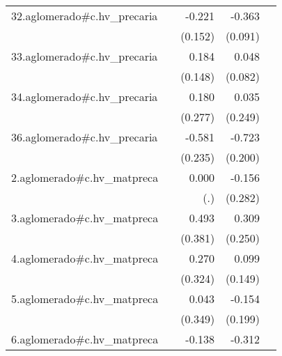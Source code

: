 {\begin{longtable}{l*{4}{D{.}{.}{-1}}}
\addlinespace
32.aglomerado#c.hv\_precaria&                     &      -0.221         &      -0.363\sym{***}&                     \\
            &                     &     (0.152)         &     (0.091)         &                     \\
\addlinespace
33.aglomerado#c.hv\_precaria&                     &       0.184         &       0.048         &                     \\
            &                     &     (0.148)         &     (0.082)         &                     \\
\addlinespace
34.aglomerado#c.hv\_precaria&                     &       0.180         &       0.035         &                     \\
            &                     &     (0.277)         &     (0.249)         &                     \\
\addlinespace
36.aglomerado#c.hv\_precaria&                     &      -0.581\sym{*}  &      -0.723\sym{***}&                     \\
            &                     &     (0.235)         &     (0.200)         &                     \\
\addlinespace
2.aglomerado#c.hv\_matpreca&                     &       0.000         &      -0.156         &                     \\
            &                     &         (.)         &     (0.282)         &                     \\
\addlinespace
3.aglomerado#c.hv\_matpreca&                     &       0.493         &       0.309         &                     \\
            &                     &     (0.381)         &     (0.250)         &                     \\
\addlinespace
4.aglomerado#c.hv\_matpreca&                     &       0.270         &       0.099         &                     \\
            &                     &     (0.324)         &     (0.149)         &                     \\
\addlinespace
5.aglomerado#c.hv\_matpreca&                     &       0.043         &      -0.154         &                     \\
            &                     &     (0.349)         &     (0.199)         &                     \\
\addlinespace
6.aglomerado#c.hv\_matpreca&                     &      -0.138         &      -0.312         &                     \\

\end{longtable}}
